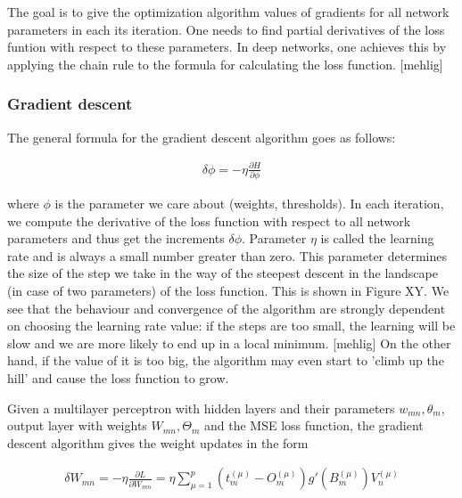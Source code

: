 The goal is to give the optimization algorithm values of gradients for all network parameters in each its iteration. One needs to find partial derivatives of the loss funtion with respect to these parameters. In deep networks, one achieves this by applying the chain rule to the formula for calculating the loss function. [mehlig]

\subsubsection{Gradient descent}

The general formula for the gradient descent algorithm goes as follows:

\begin{gather}
	\delta \phi = - \eta \frac{\partial H}{\partial \phi}
\end{gather}

where $ \phi $ is the parameter we care about (weights, thresholds). In each iteration, we compute the derivative of the loss function with respect to all network parameters and thus get the increments $ \delta \phi $. Parameter $ \eta $ is called the learning rate and is always a small number greater than zero. This parameter determines the size of the step we take in the way of the steepest descent in the landscape (in case of two parameters) of the loss function. This is shown in Figure XY. We see that the behaviour and convergence of the algorithm are strongly dependent on choosing the learning rate value: if the steps are too small, the learning will be slow and we are more likely to end up in a local minimum. [mehlig] On the other hand, if the value of it is too big, the algorithm may even start to 'climb up the hill' and cause the loss function to grow. 

Given a multilayer perceptron with hidden layers and their parameters $ w_{mn}, \theta_m $, output layer with weights $ W_{mn}, \Theta_m $ and the MSE loss function, the gradient descent algorithm gives the weight updates in the form


\begin{gather}
	\delta W_{mn} = - \eta \frac{\partial L}{\partial W_{mn}} = \eta \sum\limits_{\mu=1}^{p}
	(t_{m}^{(\mu)} - O_{m}^{(\mu)})   g'(B_{m}^{(\mu)})     V_{n}^{(\mu)}	
\end{gather}

